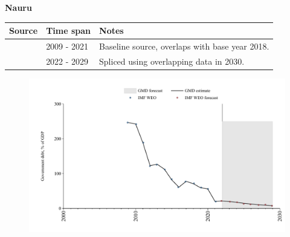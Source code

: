 \documentclass[12pt,a4paper,landscape]{article}
\begin{document}
\begin{adjustbox}{max totalsize={\paperwidth}{\paperheight},center}
\begin{minipage}[t][\textheight][t]{\textwidth}
\vspace*{0.5cm}
{}
\begin{center}
{\Large\bfseries Nauru}
\end{center}
\vspace{0.5cm}
\begin{table}[H]
\centering
\small
\begin{tabular}{|l|l|l|}
\hline
\textbf{Source} & \textbf{Time span} & \textbf{Notes} \\
\hline
\rowcolor{white}\cite{IMF_WEO}& 2009 - 2021 &Baseline source, overlaps with base year 2018.\\
\rowcolor{lightgray}\cite{IMF_WEO_forecast}& 2022 - 2029 &Spliced using overlapping data in 2030.\\
\hline
\end{tabular}
\end{table}
\begin{figure}[H]
\centering
\includegraphics[width=\textwidth,height=0.6\textheight,keepaspectratio]{graphs/NRU_govdebt_GDP.pdf}
\end{figure}
\end{minipage}
\end{adjustbox}
\end{document}
